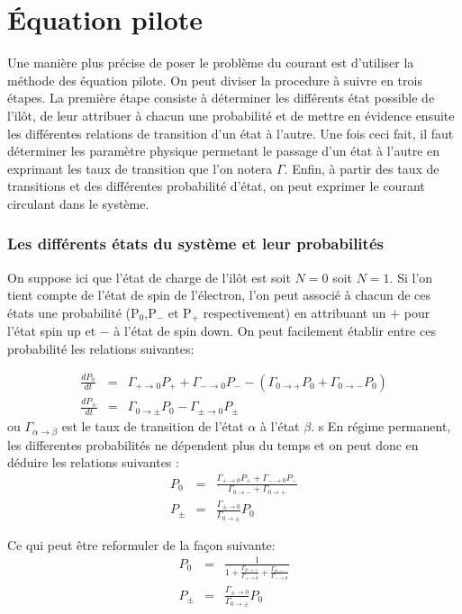 \section{\'Equation pilote}
Une manière plus précise de poser le problème du courant est d'utiliser la méthode des équation pilote. On peut diviser la procedure à suivre en trois étapes. La première étape consiste à déterminer les différents état possible de l'ilôt, de leur attribuer à chacun une probabilité et de mettre en évidence ensuite les différentes relations de transition d'un état à l'autre. Une fois ceci fait, il faut déterminer les paramètre physique permetant le passage d'un état à l'autre en exprimant les taux de transition que l'on notera $\Gamma$. Enfin, à partir des taux de transitions et des différentes probabilité d'état, on peut exprimer le courant circulant dans le système.

\subsubsection{Les différents états du système et leur probabilités}
On suppose ici que l'état de charge de l'ilôt est soit $N=0$ soit $N=1$. Si l'on tient compte de l'état de spin de l'électron, l'on peut associé à chacun de ces états une probabilité (P$_0$,P$_-$ et P$_+$ respectivement) en attribuant un $+$ pour l'état spin up et $-$ à l'état de spin down. On peut facilement établir entre ces probabilité les relations suivantes:

\begin{eqnarray}
\frac{dP_0}{dt} &=& \Gamma_{+ \rightarrow 0}P_+ + \Gamma_{- \rightarrow 0}P_-  -(\Gamma_{0 \rightarrow +}P_0 + \Gamma_{0 \rightarrow -}P_0) \nonumber \\
\frac{dP_\pm}{dt} &=& \Gamma_{0 \rightarrow \pm}P_0 - \Gamma_{\pm \rightarrow 0}P_\pm \nonumber
\end{eqnarray}
ou $\Gamma_{\alpha \rightarrow \beta}$ est le taux de transition de l'état $\alpha$ à l'état $\beta$. 
s
En régime permanent, les differentes probabilités ne dépendent plus du temps et on peut donc en déduire les relations suivantes :
\begin{eqnarray}
P_0 &=& \frac{\Gamma_{+ \rightarrow 0}P_{+} + \Gamma_{- \rightarrow 0}P_{-}}{\Gamma_{0 \rightarrow -} + \Gamma_{0 \rightarrow +} }\\
P_{\pm} &=& \frac{\Gamma_{\pm \rightarrow 0}}{\Gamma_{0 \rightarrow \pm}}P_0 
\end{eqnarray}

Ce qui peut être reformuler de la façon suivante:
\begin{eqnarray}
P_0 &=& \frac{1}{1 + \frac{\Gamma_{0 \rightarrow +}}{\Gamma_{+ \rightarrow 0}} + \frac{\Gamma_{0 \rightarrow -}}{\Gamma_{- \rightarrow 0}}} \\
P_{\pm} &=& \frac{\Gamma_{\pm \rightarrow 0}}{\Gamma_{0 \rightarrow \pm}}P_0 
\end{eqnarray}


